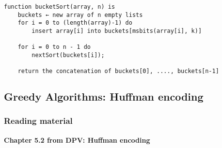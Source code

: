 \documentclass[a4paper,11pt]{article}
\begin{document}
\begin{enumerate}
\begin{itemize}
\begin{verbatim}
function bucketSort(array, n) is
    buckets ← new array of n empty lists
    for i = 0 to (length(array)-1) do
        insert array[i] into buckets[msbits(array[i], k)]

    for i = 0 to n - 1 do
        nextSort(buckets[i]);

    return the concatenation of buckets[0], ...., buckets[n-1]
\end{verbatim}
  \end{itemize}
\end{enumerate}

\subsection{Greedy Algorithms: Huffman
encoding}\label{greedy-algorithms-huffman-encoding}

\subsubsection{Reading material}\label{reading-material-1}

\paragraph{Chapter 5.2 from DPV: Huffman
encoding}\label{chapter-5.2-from-dpv-huffman-encoding}
\end{document}
